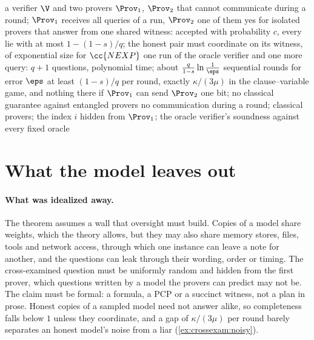 \begin{refsection}
{a verifier $\V$ and two provers $\Prov_1$, $\Prov_2$ that cannot communicate during a round; $\Prov_1$ receives all queries of a run, $\Prov_2$ one of them}
{yes for isolated provers that answer from one shared witness: accepted with probability $c$, every lie with at most $1-(1-s)/q$; the honest pair must coordinate on its witness, of exponential size for $\cc{NEXP}$}
{one run of the oracle verifier and one more query: $q+1$ questions, polynomial time; about $\frac q{1-s}\ln\frac1\eps$ sequential rounds for error $\eps$}
{at least $(1-s)/q$ per round, exactly $\kappa/(3\mu)$ in the clause--variable game, and nothing there if $\Prov_1$ can send $\Prov_2$ one bit; no classical guarantee against entangled provers}
{no communication during a round; classical provers; the index $i$ hidden from $\Prov_1$; the oracle verifier's soundness against every fixed oracle}

\section{What the model leaves out}\label{sec:crossexam:leavesout}

\paragraph{What was idealized away.} The theorem assumes a wall that oversight must build. Copies of a model share weights, which the theory allows, but they may also share memory stores, files, tools and network access, through which one instance can leave a note for another, and the questions can leak through their wording, order or timing. The cross-examined question must be uniformly random and hidden from the first prover, which questions written by a model the provers can predict may not be. The claim must be formal: a formula, a PCP or a succinct witness, not a plan in prose. Honest copies of a sampled model need not answer alike, so completeness falls below $1$ unless they coordinate, and a gap of $\kappa/(3\mu)$ per round barely separates an honest model's noise from a liar (\cref{ex:crossexam:noisy}).


\end{refsection}
